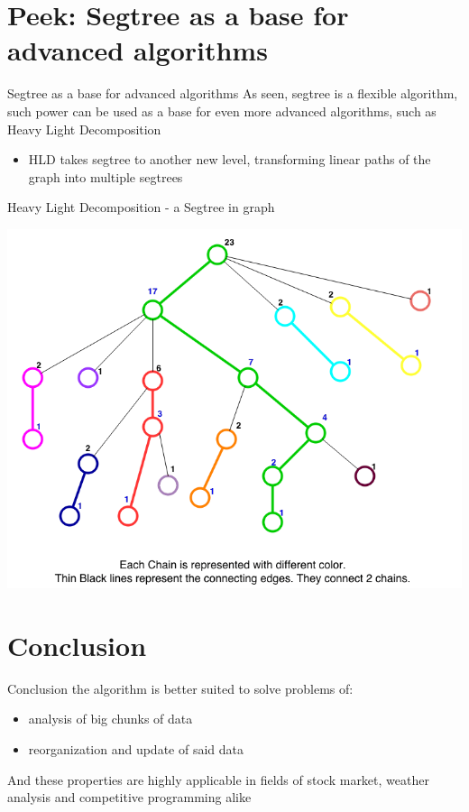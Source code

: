 \documentclass[presentation,12pt]{beamer}
\begin{document}
\section{Peek: Segtree as a base for advanced algorithms}
\label{sec:orge61c458}
\begin{frame}[label={sec:org8b6ea4b}]{Segtree as a base for advanced algorithms}
As seen, segtree is a flexible algorithm, such power can be used as a base for even more advanced algorithms, such as Heavy Light Decomposition
\begin{itemize}
\item HLD takes segtree to another new level, transforming linear paths of the graph into multiple segtrees
\end{itemize}
\end{frame}
\begin{frame}[label={sec:org63cf378}]{Heavy Light Decomposition - a Segtree in graph}
\begin{center}
\includegraphics[width=.9\linewidth]{./img/hld.png}
\end{center}
\end{frame}
\section{Conclusion}
\label{sec:org2caf795}
\begin{frame}[label={sec:orgd18b086}]{Conclusion}
the algorithm is better suited to solve problems of:
\begin{itemize}
\item analysis of big chunks of data
\item reorganization and update of said data
\end{itemize}
And these properties are highly applicable in fields of stock market, weather analysis and competitive programming alike
\end{frame}
\end{document}
